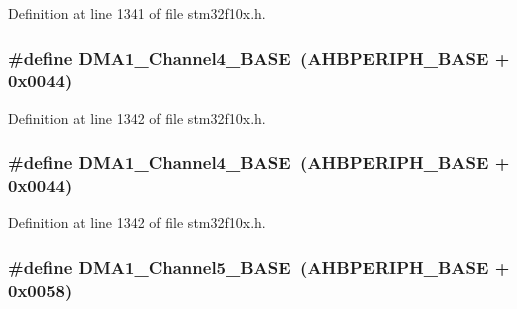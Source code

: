 Definition at line 1341 of file stm32f10x.\+h.

\subsubsection[{\texorpdfstring{D\+M\+A1\+\_\+\+Channel4\+\_\+\+B\+A\+SE}{DMA1_Channel4_BASE}}]{\setlength{\rightskip}{0pt plus 5cm}\#define D\+M\+A1\+\_\+\+Channel4\+\_\+\+B\+A\+SE~({\bf A\+H\+B\+P\+E\+R\+I\+P\+H\+\_\+\+B\+A\+SE} + 0x0044)}\hypertarget{group___peripheral__memory__map_ga1adc93cd0baf0897202c71110e045692}{}\label{group___peripheral__memory__map_ga1adc93cd0baf0897202c71110e045692}


Definition at line 1342 of file stm32f10x.\+h.

\subsubsection[{\texorpdfstring{D\+M\+A1\+\_\+\+Channel4\+\_\+\+B\+A\+SE}{DMA1_Channel4_BASE}}]{\setlength{\rightskip}{0pt plus 5cm}\#define D\+M\+A1\+\_\+\+Channel4\+\_\+\+B\+A\+SE~({\bf A\+H\+B\+P\+E\+R\+I\+P\+H\+\_\+\+B\+A\+SE} + 0x0044)}\hypertarget{group___peripheral__memory__map_ga1adc93cd0baf0897202c71110e045692}{}\label{group___peripheral__memory__map_ga1adc93cd0baf0897202c71110e045692}


Definition at line 1342 of file stm32f10x.\+h.

\subsubsection[{\texorpdfstring{D\+M\+A1\+\_\+\+Channel5\+\_\+\+B\+A\+SE}{DMA1_Channel5_BASE}}]{\setlength{\rightskip}{0pt plus 5cm}\#define D\+M\+A1\+\_\+\+Channel5\+\_\+\+B\+A\+SE~({\bf A\+H\+B\+P\+E\+R\+I\+P\+H\+\_\+\+B\+A\+SE} + 0x0058)}\hypertarget{group___peripheral__memory__map_gac041a71cd6c1973964f847a68aa14478}{}\label{group___peripheral__memory__map_gac041a71cd6c1973964f847a68aa14478}


